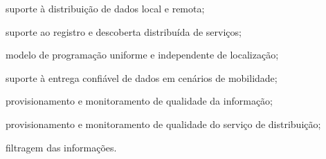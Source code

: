 \begin{alineas}
	\item suporte à distribuição de dados local e remota;

	\item suporte ao registro e descoberta distribuída de serviços;

	\item modelo de programação uniforme e independente de localização;

	\item suporte à entrega confiável de dados em cenários de mobilidade;

	\item provisionamento e monitoramento de qualidade da informação;

	\item provisionamento e monitoramento de qualidade do serviço de distribuição;

	\item filtragem das informações.
\end{alineas}

